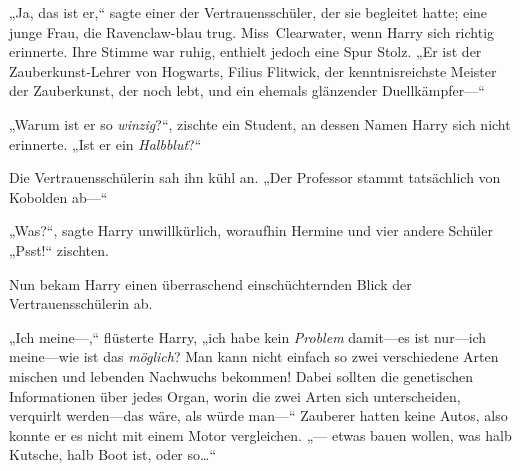 „Ja, das ist er,“ sagte einer der Vertrauensschüler, der sie begleitet hatte; eine junge Frau, die Ravenclaw-blau trug. Miss~Clearwater, wenn Harry sich richtig erinnerte. Ihre Stimme war ruhig, enthielt jedoch eine Spur Stolz. „Er ist der Zauberkunst-Lehrer von Hogwarts, Filius Flitwick, der kenntnisreichste Meister der Zauberkunst, der noch lebt, und ein ehemals glänzender Duellkämpfer—“




„Warum ist er so \emph{winzig}?“, zischte ein Student, an dessen Namen Harry sich nicht erinnerte. „Ist er ein \emph{Halbblut}?“

Die Vertrauensschülerin sah ihn kühl an. „Der Professor stammt tatsächlich von Kobolden ab—“

„Was?“, sagte Harry unwillkürlich, woraufhin Hermine und vier andere Schüler „Psst!“ zischten.

Nun bekam Harry einen überraschend einschüchternden Blick der Vertrauensschülerin ab.

„Ich meine—,“ flüsterte Harry, „ich habe kein \emph{Problem} damit—es ist nur—ich meine—wie ist das \emph{möglich}? Man kann nicht einfach so zwei verschiedene Arten mischen und lebenden Nachwuchs bekommen! Dabei sollten die genetischen Informationen über jedes Organ, worin die zwei Arten sich unterscheiden, verquirlt werden—das wäre, als würde man—“ Zauberer hatten keine Autos, also konnte er es nicht mit einem Motor vergleichen. „— etwas bauen wollen, was halb Kutsche, halb Boot ist, oder so…“

